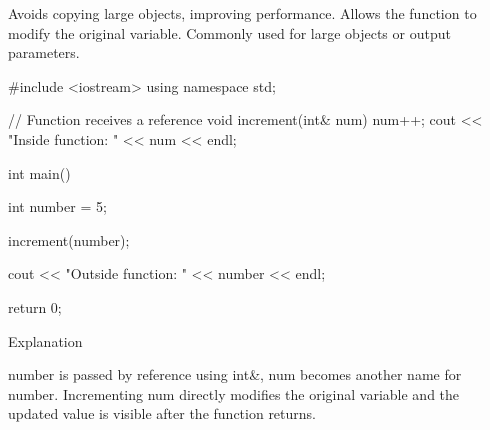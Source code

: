 Avoids copying large objects, improving performance.
Allows the function to modify the original variable.
Commonly used for large objects or output parameters.

#include <iostream>
using namespace std;

// Function receives a reference
void increment(int& num)
{
    num++;
    cout << "Inside function: " << num << endl;
}

int main()
{
    int number = 5;

    increment(number);

    cout << "Outside function: " << number << endl;

    return 0;
}

Explanation

number is passed by reference using int&, num becomes another name for number.
Incrementing num directly modifies the original variable and the updated value is visible after the function returns.

